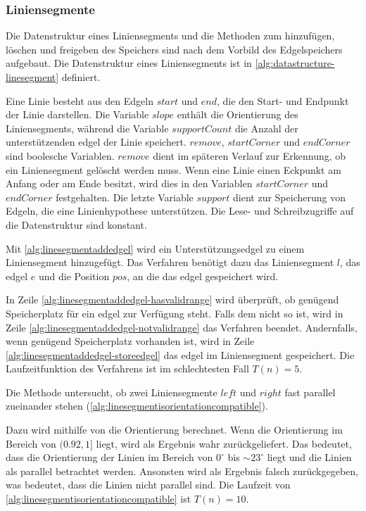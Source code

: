 \subsubsection{Liniensegmente} %
\label{sub:datenstruktur-liniensegmente}

Die Datenstruktur eines Liniensegments und die Methoden zum hinzufügen, löschen und freigeben des Speichers sind nach
 dem Vorbild des Edgelspeichers aufgebaut. Die Datenstruktur eines Liniensegments ist in
 \autoref{alg:datastructure-linesegment} definiert.

Eine Linie besteht aus den Edgeln $\mathit{start}$ und $\mathit{end}$, die den Start- und Endpunkt der Linie
 darstellen. Die Variable $\mathit{slope}$ enthält die Orientierung des Liniensegments, während die Variable
 $\mathit{supportCount}$ die Anzahl der unterstützenden \gls{edgel} der Linie speichert. $\mathit{remove}$,
 $\mathit{startCorner}$ und $\mathit{endCorner}$ sind boolesche Variablen. $\mathit{remove}$ dient im späteren Verlauf
 zur Erkennung, ob ein Liniensegment gelöscht werden muss. Wenn eine Linie einen Eckpunkt am Anfang oder am Ende
 besitzt, wird dies in den Variablen $\mathit{startCorner}$ und $\mathit{endCorner}$ festgehalten. Die letzte Variable
 $\mathit{support}$ dient zur Speicherung von Edgeln, die eine Linienhypothese unterstützen. Die Lese- und
 Schreibzugriffe auf die Datenstruktur sind konstant.

Mit \autoref{alg:linesegmentaddedgel} wird ein Unterstützungsedgel zu einem Liniensegment hinzugefügt. Das Verfahren
 benötigt dazu das Liniensegment $l$, das \gls{edgel} $e$ und die Position $\mathit{pos}$, an die das \gls{edgel}
 gespeichert wird.

In Zeile \ref{alg:linesegmentaddedgel-hasvalidrange} wird überprüft, ob genügend Speicherplatz für ein \gls{edgel} zur
 Verfügung steht. Falls dem nicht so ist, wird in Zeile \ref{alg:linesegmentaddedgel-notvalidrange} das Verfahren
 beendet. Andernfalls, wenn genügend Speicherplatz vorhanden ist, wird in Zeile
 \ref{alg:linesegmentaddedgel-storeedgel} das \gls{edgel} im Liniensegment gespeichert. Die Laufzeitfunktion des
 Verfahrens ist im schlechtesten Fall $T(n) = 5$.

Die Methode  untersucht, ob zwei Liniensegmente $\mathit{left}$ und $\mathit{right}$
 fast parallel zueinander stehen (\autoref{alg:linesegmentisorientationcompatible}).

Dazu wird mithilfe von  die Orientierung berechnet. Wenn die Orientierung im Bereich von
 $(0.92,1]$ liegt, wird als Ergebnis wahr zurückgeliefert. Das bedeutet, dass die Orientierung der Linien im Bereich
 von $0^\circ$ bis $\sim 23^\circ$ liegt und die Linien als parallel betrachtet werden. Ansonsten wird als Ergebnis
 falsch zurückgegeben, was bedeutet, dass die Linien nicht parallel sind. Die Laufzeit von
 \autoref{alg:linesegmentisorientationcompatible} ist $T(n) = 10$.

